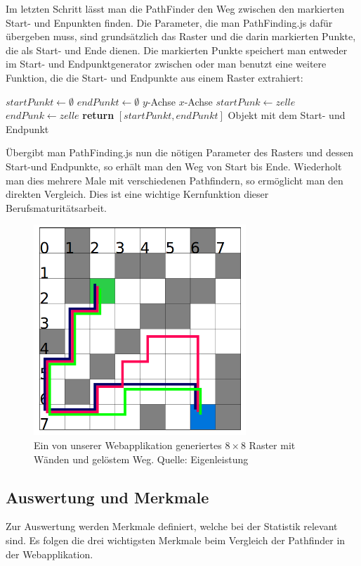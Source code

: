 \documentclass[12pt,a4paper,german]{report}
\begin{document}
Im letzten Schritt lässt man die PathFinder den Weg zwischen den markierten Start- und Enpunkten finden. Die Parameter, die man PathFinding.js dafür übergeben muss, sind grundsätzlich das Raster und die darin markierten Punkte, die als Start- und Ende dienen. Die markierten Punkte speichert man entweder im Start- und Endpunktgenerator zwischen oder man benutzt eine weitere Funktion, die die Start- und Endpunkte aus einem Raster extrahiert:
\begin{algorithmic}[1]
  \State $startPunkt \gets \emptyset$
  \State $endPunkt \gets \emptyset$
   \Comment $y$-Achse
     \Comment $x$-Achse
      \State $startPunk \gets zelle$
      \State $endPunk \gets zelle$
    \EndIf
    \EndFor
  \EndFor
  \State \textbf{return} $[startPunkt, endPunkt]$ \Comment Objekt mit dem Start- und Endpunkt
  \EndProcedure
\end{algorithmic}
Übergibt man PathFinding.js nun die nötigen Parameter des Rasters und dessen Start-und Endpunkte, so erhält man den Weg von Start bis Ende. Wiederholt man dies mehrere Male mit verschiedenen Pathfindern, so ermöglicht man den direkten Vergleich. Dies ist eine wichtige Kernfunktion dieser Berufsmaturitätsarbeit.
\begin{figure}[H]
  \centering
  \includegraphics[width=8cm]{grid3}
  \caption[Ein von unserer Webapplikation generiertes $8\times8$ Raster mit Wänden und gelöstem Weg.]{Ein von unserer Webapplikation generiertes $8\times8$ Raster mit Wänden und gelöstem Weg. Quelle: Eigenleistung}
  \label{fig:grid3}
\end{figure}
\subsection{Auswertung und Merkmale}
Zur Auswertung werden Merkmale definiert, welche bei der Statistik relevant sind. Es folgen die drei wichtigsten Merkmale beim Vergleich der Pathfinder in der Webapplikation.
\end{document}
